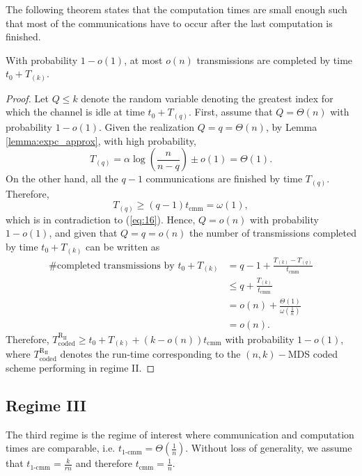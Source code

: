 \documentclass[onecolumn,journal,twoside]{IEEEtran}
\begin{document}
The following theorem states that the computation times are small enough such that most of the communications have to occur after the last computation is finished.
\begin{theorem}
With probability $1-o(1)$, at most $o(n)$ transmissions are completed by time $t_0 +T_{(k)}$.
\end{theorem}
\begin{proof}
Let $Q\leq k$ denote the random variable denoting the greatest index for which the channel is idle at time $t_0 + T_{(q)}$. First, assume that $Q=\Theta (n)$ with probability $1 - o(1)$. Given the realization $Q = q = \Theta(n)$,  by Lemma \ref{lemma:expc_approx}, with high probability,
\begin{equation}\label{eq:16}
T_{(q)} = \alpha \log (\frac{n}{n-q}) \pm o(1) = \Theta(1).
\end{equation}
On the other hand, all the $q-1$ communications are finished by time $T_{(q)}$. Therefore, 
\begin{equation}
T_{(q)} \geq (q-1) t_{\text{cmm}}= \omega(1),
\end{equation}
which is in contradiction to (\ref{eq:16}). Hence, $Q=o(n)$ with probability $1 - o(1)$, and given that $Q = q = o(n)$ the number of transmissions completed by time $t_0+T_{(k)}$ can be written as 
\begin{align}
\text{\# completed transmissions by } t_0+T_{(k)}&=q-1+\frac{T_{(k)}-T_{(q)}}{t_{\text{cmm}}}\\ &\leq q+\frac{T_{(k)}}{t_{\text{cmm}}} \nonumber\\
&= o(n) + \frac{\Theta(1)}{\omega(\frac{1}{n})}\nonumber\\
&= o(n).
\end{align}
Therefore, $T^{\text{R}_{\text{II}}}_{\text{coded}}\geq t_0+T_{(k)}+(k-o(n))t_{\text{cmm}}$ with probability $1-o(1)$, where $T^{\text{R}_{\text{II}}}_{\text{coded}}$ denotes the run-time corresponding to the $(n,k)-$MDS coded scheme performing in regime II.
\end{proof}

\subsection{Regime III}
The third regime is the regime of interest where communication and computation times are comparable, i.e. $t_{\text{1-cmm}}=\Theta(\frac{1}{n})$. Without loss of generality, we assume that $t_{\text{1-cmm}}=\frac{k}{rn}$ and therefore $t_{\text{cmm}}=\frac{1}{n}$. 
\end{document}
